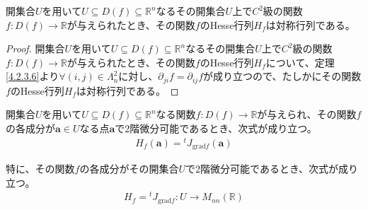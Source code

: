 \documentclass[dvipdfmx]{jsarticle}
\begin{document}
\begin{thm}\label{4.2.7.6}
開集合$U$を用いて$U \subseteq D(f) \subseteq \mathbb{R}^{n}$なるその開集合$U$上で$C^{2}$級の関数$f:D(f) \rightarrow \mathbb{R}$が与えられたとき、その関数$f$のHesse行列$H_{f}$は対称行列である。
\end{thm}
\begin{proof}
開集合$U$を用いて$U \subseteq D(f) \subseteq \mathbb{R}^{n}$なるその開集合$U$上で$C^{2}$級の関数$f:D(f) \rightarrow \mathbb{R}$が与えられたとき、その関数$f$のHesse行列$H_{f}$について、定理\ref{4.2.3.6}より$\forall(i,j) \in \varLambda_{n}^{2}$に対し、$\partial_{ji}f = \partial_{ij}f$が成り立つので、たしかにその関数$f$のHesse行列$H_{f}$は対称行列である。
\end{proof}
\begin{thm}\label{4.2.7.7}
開集合$U$を用いて$U \subseteq D(f) \subseteq \mathbb{R}^{n}$なる関数$f:D(f) \rightarrow \mathbb{R}$が与えられ、その関数$f$の各成分が$\mathbf{a} \in U$なる点$\mathbf{a}$で2階微分可能であるとき、次式が成り立つ。
\begin{align*}
H_{f}\left( \mathbf{a} \right) ={}^{t}J_{\mathrm{grad}f}\left( \mathbf{a} \right)
\end{align*}\par
特に、その関数$f$の各成分がその開集合$U$で2階微分可能であるとき、次式が成り立つ。
\begin{align*}
H_{f} ={}^{t}J_{\mathrm{grad}f}:U \rightarrow M_{nn}\left( \mathbb{R} \right)
\end{align*}
\end{thm}
\end{document}
